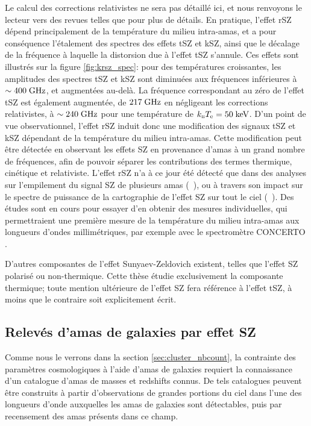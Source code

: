 Le calcul des corrections relativistes ne sera pas détaillé ici, et nous renvoyons le lecteur vers des revues telles que \cite{mroczkowski_astrophysics_2019} pour plus de détails.
En pratique, l'effet rSZ dépend principalement de la température du milieu intra-amas, et a pour conséquence l'étalement des spectres des effets tSZ et kSZ, ainsi que le décalage de la fréquence à laquelle la distorsion due à l'effet tSZ s'annule.
Ces effets sont illustrés sur la figure \ref{fig:krsz_spec}: pour des températures croissantes, les amplitudes des spectres tSZ et kSZ sont diminuées aux fréquences inférieures à $\sim 400 \;{\rm GHz}$, et augmentées au-delà.
La fréquence correspondant au zéro de l'effet tSZ est également augmentée, de $217 \;{\rm GHz}$ en négligeant les corrections relativistes, à $\sim 240 \;{\rm GHz}$ pour une température de $k_\textsc{b} T_{\rm e} = 50 \;{\rm keV}$.
D'un point de vue observationnel, l'effet rSZ induit donc une modification des signaux tSZ et kSZ dépendant de la température du milieu intra-amas.
Cette modification peut être détectée en observant les effets SZ en provenance d'amas à un grand nombre de fréquences, afin de pouvoir séparer les contributions des termes thermique, cinétique et relativiste.
L'effet rSZ n'a à ce jour été détecté que dans des analyses sur l'empilement du signal SZ de plusieurs amas (\eg\ \cite{hurier_high_2016}), ou à travers son impact sur le spectre de puissance de la cartographie de l'effet SZ sur tout le ciel (\eg\ \cite{remazeilles_can_2019}).
Des études sont en cours pour essayer d'en obtenir des mesures individuelles, qui permettraient une première mesure de la température du milieu intra-amas aux longueurs d'ondes millimétriques, par exemple avec le spectromètre CONCERTO \cite{the_concerto_collaboration_wide_2020}.

D'autres composantes de l'effet Sunyaev-Zeldovich existent, telles que l'effet SZ polarisé ou non-thermique.
Cette thèse étudie exclusivement la composante thermique; toute mention ultérieure de l'effet SZ fera référence à l'effet tSZ, à moins que le contraire soit explicitement écrit.

\subsection{Relevés d'amas de galaxies par effet SZ}

Comme nous le verrons dans la section \ref{sec:cluster_nbcount}, la contrainte des paramètres cosmologiques à l'aide d'amas de galaxies requiert la connaissance d'un catalogue d'amas de masses et redshifts connus.
De tels catalogues peuvent être construits à partir d'observations de grandes portions du ciel dans l'une des longueurs d'onde auxquelles les amas de galaxies sont détectables, puis par recensement des amas présents dans ce champ.


